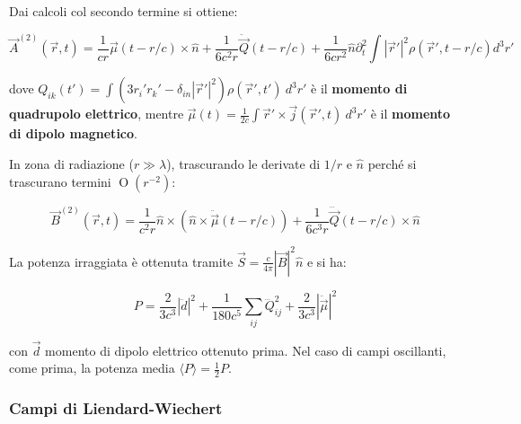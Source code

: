 \documentclass[10pt, a4paper]{scrartcl}
\numberwithin{equation}{subsection}
\theoremstyle{style1}
\newenvironment{boxenv}[1][]{
    \begin{eqbox}[#1]
    }{
   \end{eqbox}
}
\begin{document}
Dai calcoli col secondo termine si ottiene:
\begin{boxenv}[]
\begin{equation}
	\vec{A}^{(2)}  (\vec{r},t) = \frac{1}{cr} \vec{\mu }(t- r / c) \times  \hat{n}+ \frac{1}{6c^2 r }\ddot{\vec{Q}}(t- r / c) + \frac{1}{6cr^2} \hat{n} \partial _t^2 \int \left\lvert \vec{r}' \right\rvert ^2 \rho (\vec{r}', t- r / c) d^3r'
\end{equation}
\end{boxenv}
\noindent dove $Q_{ik} (t') = \int \left(3r_i' r_k' - \delta _{in} \left\lvert \vec{r}' \right\rvert ^2 \right) \rho (\vec{r}',t') \ d^3 r'$ \`e il \textbf{momento di quadrupolo elettrico}, mentre $\vec{\mu }(t)= \frac{1}{2c}\int \vec{r}' \times \vec{j}(\vec{r}',t) \ d^3 r'  $ \`e il \textbf{momento di dipolo magnetico}.

In zona di radiazione ($r\gg\lambda $), trascurando le derivate di $1 / r$ e $\hat{n}$ perch\'e si trascurano termini $\operatorname{O} (r^{-2} )$:
\begin{boxenv}[]
\begin{equation}
	\vec{B}^{(2)} (\vec{r}, t) = \frac{1}{c^2 r }\hat{n}\times \left(\hat{n}\times \ddot{\vec{\mu }}(t- r / c)\right) + \frac{1}{6c^3 r}\dddot{\vec{Q}}(t- r / c) \times \hat{n}
\end{equation}
\end{boxenv}
\noindent La potenza irraggiata \`e ottenuta tramite $\vec{S}= \frac{c}{4\pi}|\vec{B}|^2 \hat{n}$ e si ha:
\begin{boxenv}[]
\begin{equation}
	P = \frac{2}{3c^3} |\ddot{d}|^2 + \frac{1}{180 c^5} \sum_{ij}^{} \dddot{Q}_{ij} ^2 + \frac{2}{3c^3}\left\lvert \ddot{\vec{\mu }} \right\rvert ^2
\end{equation}
\end{boxenv}
\noindent con $\vec{d}$ momento di dipolo elettrico ottenuto prima. Nel caso di campi oscillanti, come prima, la potenza media $\langle  P\rangle = \frac{1}{2}P$.
\subsubsection{Campi di Liendard-Wiechert}
\end{document}
